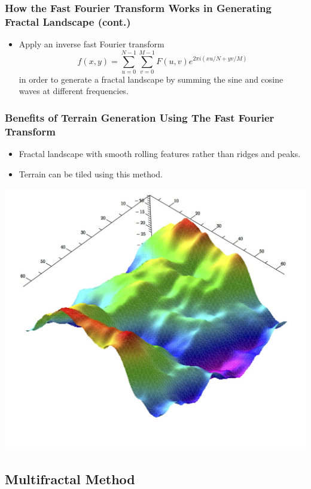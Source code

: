 \documentclass{beamer}
\begin{document}
\begin{frame}
\frametitle{How the Fast Fourier Transform Works in Generating Fractal Landscape (cont.)}
\begin{itemize}
\item Apply an inverse fast Fourier transform
$$f(x,y)=\displaystyle\sum\limits_{u=0}^{N-1} \displaystyle\sum\limits_{v=0}^{M-1} F(u,v)e^{2\pi i(xu/N+yv/M)}$$ 
in order to generate a fractal landscape by summing the sine and cosine waves at different frequencies. 
\end{itemize}
\end{frame}

\begin{frame}
\frametitle{Benefits of Terrain Generation Using The Fast Fourier Transform}
\begin{itemize}
\item Fractal landscape with smooth rolling features rather than ridges and peaks.
\item Terrain can be tiled using this method.
\end{itemize}
\begin{center}
\includegraphics[scale=0.3]{FourierLandscape.jpg}

\end{center}
\end{frame}

\subsection{Multifractal Method}
\end{document}

